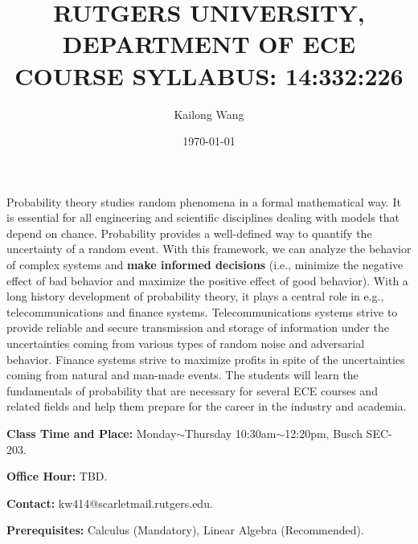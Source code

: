 \documentclass{article}
\title{RUTGERS UNIVERSITY, DEPARTMENT OF ECE \\
COURSE SYLLABUS: 14:332:226}
\author{Kailong Wang}
\date{\today}
\begin{document}
\maketitle
Probability theory studies random phenomena in a formal mathematical way. It is essential for all engineering and scientific disciplines dealing with models that depend on chance.
Probability provides a well-defined way to quantify the uncertainty of a random event. With this framework, we can analyze the behavior of complex systems and \textbf{make informed decisions} (i.e., minimize the negative effect of bad behavior and maximize the positive effect of good behavior).
With a long history development of probability theory, it plays a central role in e.g.,  telecommunications and finance systems. Telecommunications systems strive to provide reliable and secure transmission and storage of information under the uncertainties coming from various types of random noise and adversarial behavior. Finance systems strive to maximize profits in spite of the uncertainties coming from natural and man-made events.
The students will learn the fundamentals of probability that are necessary for several ECE courses and related fields and help them prepare for the career in the industry and academia.

\textbf{Class Time and Place:} Monday$\sim$Thursday 10:30am$\sim$12:20pm, Busch SEC-203.

\textbf{Office Hour:} TBD.

\textbf{Contact:} kw414@scarletmail.rutgers.edu.

\textbf{Prerequisites:} Calculus (Mandatory), Linear Algebra (Recommended).
\end{document}
